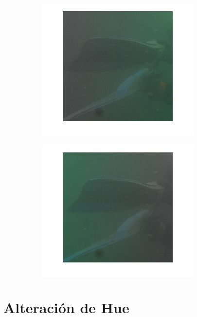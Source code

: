 \documentclass{article}
\begin{document}
\begin{figure}[H]
\begin{subfigure}{0.5\textwidth}
	\centering
        \includegraphics[width=0.9\textwidth]{transf4.png}
    \end{subfigure}\hfill
	\begin{subfigure}{0.5\textwidth}
	\centering
        \includegraphics[width=0.9\textwidth]{transf5.png}
    \end{subfigure}\hfill
\end{figure}\hfill

\section{Alteración de Hue}
\end{document}
